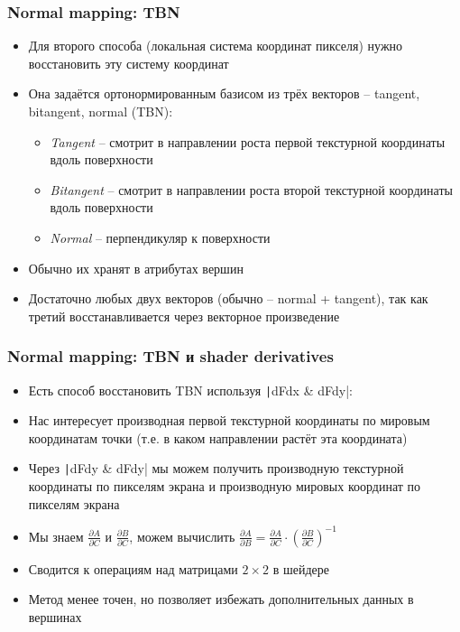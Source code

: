 \documentclass[10pt]{beamer}
\begin{document}
\begin{frame}[fragile]
\frametitle{Normal mapping: TBN}
\begin{itemize}
\item Для второго способа (локальная система координат пикселя) нужно восстановить эту систему координат
\pause
\item Она задаётся ортонормированным базисом из трёх векторов -- tangent, bitangent, normal (TBN):
\pause
\begin{itemize}
\item \textit{Tangent} -- смотрит в направлении роста первой текстурной координаты вдоль поверхности
\item \textit{Bitangent} -- смотрит в направлении роста второй текстурной координаты вдоль поверхности
\item \textit{Normal} -- перпендикуляр к поверхности
\end{itemize}
\pause
\item Обычно их хранят в атрибутах вершин
\item Достаточно любых двух векторов (обычно -- normal + tangent), так как третий восстанавливается через векторное произведение
\end{itemize}
\end{frame}

\begin{frame}[fragile]
\frametitle{Normal mapping: TBN и shader derivatives}
\begin{itemize}
\item Есть способ восстановить TBN используя \texttt|dFdx & dFdy|:
\pause
\item Нас интересует производная первой текстурной координаты по мировым координатам точки (т.е. в каком направлении растёт эта координата)
\pause
\item Через \texttt|dFdy & dFdy| мы можем получить производную текстурной координаты по пикселям экрана и производную мировых координат по пикселям экрана
\pause
\item Мы знаем \begin{math}\frac{\partial A}{\partial C}\end{math} и \begin{math}\frac{\partial B}{\partial C}\end{math}, можем вычислить \begin{math}\frac{\partial A}{\partial B} = \frac{\partial A}{\partial C} \cdot \left(\frac{\partial B}{\partial C}\right)^{-1}\end{math}
\pause
\item Сводится к операциям над матрицами \begin{math}2\times 2\end{math} в шейдере
\pause
\item Метод менее точен, но позволяет избежать дополнительных данных в вершинах
\end{itemize}
\end{frame}
\end{document}
